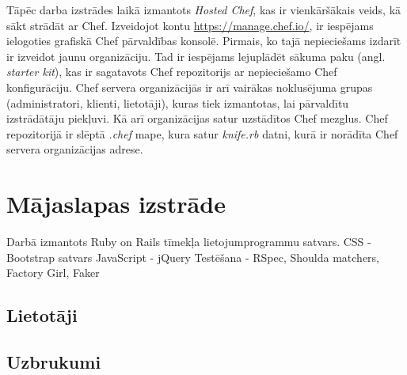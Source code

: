 Tāpēc darba izstrādes laikā izmantots \textit{Hosted Chef}, kas ir vienkāršākais veids, kā sākt strādāt ar Chef.
Izveidojot kontu \url{https://manage.chef.io/}, ir iespējams ielogoties grafiskā Chef pārvaldības konsolē.
Pirmais, ko tajā nepieciešams izdarīt ir izveidot jaunu organizāciju. Tad ir iespējams lejuplādēt sākuma paku (angl. \textit{starter kit}), kas ir sagatavots Chef repozitorijs ar nepieciešamo Chef konfigurāciju. Chef servera organizācijās ir arī vairākas noklusējuma grupas (administratori, klienti, lietotāji), kuras tiek izmantotas, lai pārvaldītu izstrādātāju piekļuvi. Kā arī organizācijas satur uzstādītos Chef mezglus. Chef repozitorijā ir slēptā \textit{.chef} mape, kura satur \textit{knife.rb} datni, kurā ir norādīta Chef servera organizācijas adrese.

\section{Mājaslapas izstrāde}
Darbā izmantots Ruby on Rails  tīmekļa lietojumprogrammu satvars.
CSS - Bootstrap satvars
JavaScript - jQuery
Testēšana - RSpec, Shoulda matchers, Factory Girl, Faker


\subsection{Lietotāji}
\subsection{Uzbrukumi}